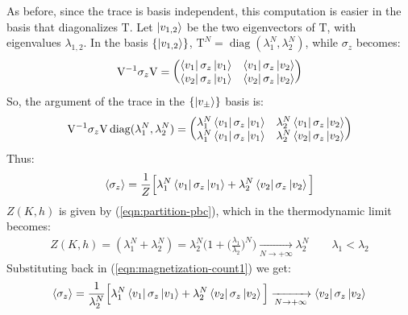 \documentclass[12pt,a4paper]{report}
\begin{document}
\begin{enumerate}
        As before, since the trace is basis independent, this computation is easier in the basis that diagonalizes $\mathrm{T}$. Let $\ket{v_{1,2}}$ be the two eigenvectors of $\mathrm{T}$, with eigenvalues $\lambda_{1,2}$. In the basis $\{\ket{v_{1,2}}\}$, $\mathrm{T}^N = \operatorname{diag}(\lambda_1^N, \lambda_2^N)$, while $\sigma_z$ becomes:
        \begin{align}\label{eqn:sigma-z-transformed}
            \mathrm{V}^{-1}\sigma_z \mathrm{V} = \begin{pmatrix}
                \bra{v_1} \sigma_z \ket{v_1} & \bra{v_1} \sigma_z \ket{v_2}\\
                \bra{v_2} \sigma_z \ket{v_1} & \bra{v_2} \sigma_z \ket{v_2}
            \end{pmatrix} 
        \end{align}
        So, the argument of the trace in the $\{\ket{v_\pm}\}$ basis is:
        \begin{align*}
            \mathrm{V}^{-1} \sigma_z \mathrm{V} \operatorname{diag}(\lambda_1^N, \lambda_2^N) = \begin{pmatrix}
                \lambda_1^N \bra{v_1} \sigma_z \ket{v_1} & \lambda_2^N \bra{v_1} \sigma_z \ket{v_2} \\
                \lambda_1^N \bra{v_1} \sigma_z \ket{v_1} & \lambda_2^N \bra{v_2} \sigma_z \ket{v_2}
            \end{pmatrix} 
        \end{align*}
        Thus:
        \begin{align}\label{eqn:magnetization-count1}
            \langle \sigma_z \rangle = \frac{1}{Z} \Big[ \lambda_1^N \bra{v_1} \sigma_z \ket{v_1} + \lambda_2^N \bra{v_2}\sigma_z \ket{v_2} \Big]
        \end{align}
        $Z(K,h)$ is given by (\ref{eqn:partition-pbc}), which in the thermodynamic limit becomes:
        \begin{align*}
            Z(K,h) = (\lambda_1^N + \lambda_2^N) = \lambda_2^N \Big(1 + \Big(\frac{\lambda_1}{\lambda_2}\Big)^N \Big)  \xrightarrow[N \to +\infty]{} \lambda_2^N \qquad \lambda_1 < \lambda_2
        \end{align*}
        Substituting back in (\ref{eqn:magnetization-count1}) we get:
        \begin{align}\label{eqn:magnetization-count2}
            \langle \sigma_z \rangle = \frac{1}{\lambda_2^N}\Big[ \lambda_1^N \bra{v_1} \sigma_z \ket{v_1} + \lambda_2^N \bra{v_2}\sigma_z \ket{v_2} \Big]  \xrightarrow[N \to +\infty]{}  \bra{v_2} \sigma_z \ket{v_2}
        \end{align}


\end{enumerate}
\end{document}
